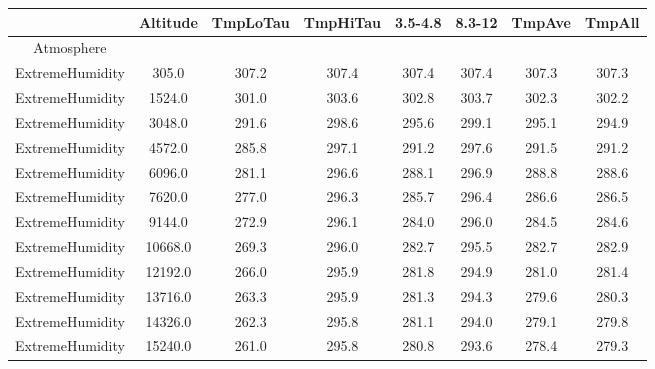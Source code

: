 \documentclass{workpackage}
\begin{document}
\begin{center}

\begin{normalsize}

\begin{tabular}{|c|c|c|c|c|c|c|c|}
\hline
&Altitude&TmpLoTau&TmpHiTau&3.5-4.8&8.3-12&TmpAve&TmpAll\\\hline
Atmosphere&&&&&&&\\\hline
ExtremeHumidity&305.0&307.2&307.4&307.4&307.4&307.3&307.3\\\hline
ExtremeHumidity&1524.0&301.0&303.6&302.8&303.7&302.3&302.2\\\hline
ExtremeHumidity&3048.0&291.6&298.6&295.6&299.1&295.1&294.9\\\hline
ExtremeHumidity&4572.0&285.8&297.1&291.2&297.6&291.5&291.2\\\hline
ExtremeHumidity&6096.0&281.1&296.6&288.1&296.9&288.8&288.6\\\hline
ExtremeHumidity&7620.0&277.0&296.3&285.7&296.4&286.6&286.5\\\hline
ExtremeHumidity&9144.0&272.9&296.1&284.0&296.0&284.5&284.6\\\hline
ExtremeHumidity&10668.0&269.3&296.0&282.7&295.5&282.7&282.9\\\hline
ExtremeHumidity&12192.0&266.0&295.9&281.8&294.9&281.0&281.4\\\hline
ExtremeHumidity&13716.0&263.3&295.9&281.3&294.3&279.6&280.3\\\hline
ExtremeHumidity&14326.0&262.3&295.8&281.1&294.0&279.1&279.8\\\hline
ExtremeHumidity&15240.0&261.0&295.8&280.8&293.6&278.4&279.3\\\hline

\end{tabular}
\end{normalsize}
\end{center}
\end{document}
